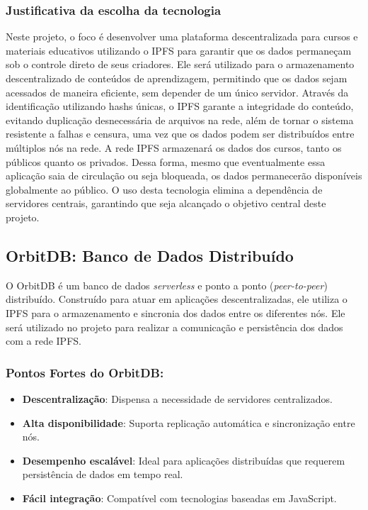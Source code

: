 \subsubsection{Justificativa da escolha da tecnologia}
Neste projeto, o foco é desenvolver uma plataforma descentralizada para cursos e materiais educativos utilizando o IPFS para garantir que os dados permaneçam sob o controle direto de seus criadores. Ele será utilizado para o armazenamento descentralizado de conteúdos de aprendizagem, permitindo que os dados sejam acessados de maneira eficiente, sem depender de um único servidor. Através da identificação utilizando hashs únicas, o IPFS garante a integridade do conteúdo, evitando duplicação desnecessária de arquivos na rede, além de tornar o sistema resistente a falhas e censura, uma vez que os dados podem ser distribuídos entre múltiplos nós na rede. A rede IPFS armazenará os dados dos cursos, tanto os públicos quanto os privados. Dessa forma, mesmo que eventualmente essa aplicação saia de circulação ou seja bloqueada, os dados permanecerão disponíveis globalmente ao público. O uso desta tecnologia elimina a dependência de servidores centrais, garantindo que seja alcançado o objetivo central deste projeto.

\subsection{OrbitDB: Banco de Dados Distribuído}

O OrbitDB é um banco de dados \textit{serverless} e ponto a ponto (\textit{peer-to-peer}) distribuído. Construído para atuar em aplicações descentralizadas, ele utiliza o IPFS para o armazenamento e sincronia dos dados entre os diferentes nós. Ele será utilizado no projeto para realizar a comunicação e persistência dos dados com a rede IPFS.

\subsubsection*{Pontos Fortes do OrbitDB:}
\begin{itemize}
    \item \textbf{Descentralização}: Dispensa a necessidade de servidores centralizados.
    \item \textbf{Alta disponibilidade}: Suporta replicação automática e sincronização entre nós.
    \item \textbf{Desempenho escalável}: Ideal para aplicações distribuídas que requerem persistência de dados em tempo real.
    \item \textbf{Fácil integração}: Compatível com tecnologias baseadas em JavaScript.
\end{itemize}

